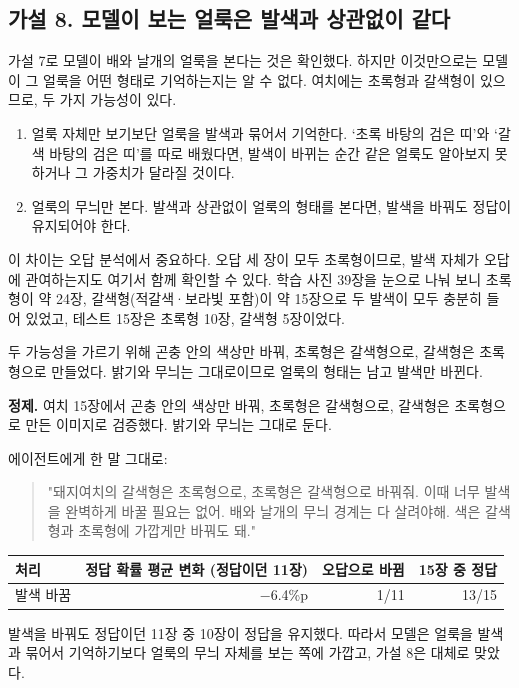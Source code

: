 \documentclass[11pt]{article}
\begin{document}
\subsection*{가설 8. 모델이 보는 얼룩은 발색과 상관없이 같다}

가설 7로 모델이 배와 날개의 얼룩을 본다는 것은 확인했다. 하지만 이것만으로는 모델이 그 얼룩을 어떤 형태로 기억하는지는 알 수 없다. 여치에는 초록형과 갈색형이 있으므로, 두 가지 가능성이 있다.
\begin{enumerate}
\item 얼룩 자체만 보기보단 얼룩을 발색과 묶어서 기억한다. `초록 바탕의 검은 띠'와 `갈색 바탕의 검은 띠'를 따로 배웠다면, 발색이 바뀌는 순간 같은 얼룩도 알아보지 못하거나 그 가중치가 달라질 것이다.
\item 얼룩의 무늬만 본다. 발색과 상관없이 얼룩의 형태를 본다면, 발색을 바꿔도 정답이 유지되어야 한다.
\end{enumerate}
이 차이는 오답 분석에서 중요하다. 오답 세 장이 모두 초록형이므로, 발색 자체가 오답에 관여하는지도 여기서 함께 확인할 수 있다. 학습 사진 39장을 눈으로 나눠 보니 초록형이 약 24장, 갈색형(적갈색·보라빛 포함)이 약 15장으로 두 발색이 모두 충분히 들어 있었고, 테스트 15장은 초록형 10장, 갈색형 5장이었다.

두 가능성을 가르기 위해 곤충 안의 색상만 바꿔, 초록형은 갈색형으로, 갈색형은 초록형으로 만들었다. 밝기와 무늬는 그대로이므로 얼룩의 형태는 남고 발색만 바뀐다.

\textbf{정제.} 여치 15장에서 곤충 안의 색상만 바꿔, 초록형은 갈색형으로, 갈색형은 초록형으로 만든 이미지로 검증했다. 밝기와 무늬는 그대로 둔다.

에이전트에게 한 말 그대로:
\begin{quote}
"돼지여치의 갈색형은 초록형으로, 초록형은 갈색형으로 바꿔줘. 이때 너무 발색을 완벽하게 바꿀 필요는 없어. 배와 날개의 무늬 경계는 다 살려야해. 색은 갈색형과 초록형에 가깝게만 바꿔도 돼."
\end{quote}

\begin{center}\footnotesize
\begin{tabular}{lrrr}
\toprule
처리 & 정답 확률 평균 변화 (정답이던 11장) & 오답으로 바뀜 & 15장 중 정답 \\
\midrule
발색 바꿈 & $-$6.4\%p & 1/11 & 13/15 \\
\bottomrule
\end{tabular}
\end{center}

발색을 바꿔도 정답이던 11장 중 10장이 정답을 유지했다. 따라서 모델은 얼룩을 발색과 묶어서 기억하기보다 얼룩의 무늬 자체를 보는 쪽에 가깝고, 가설 8은 대체로 맞았다.
\end{document}
